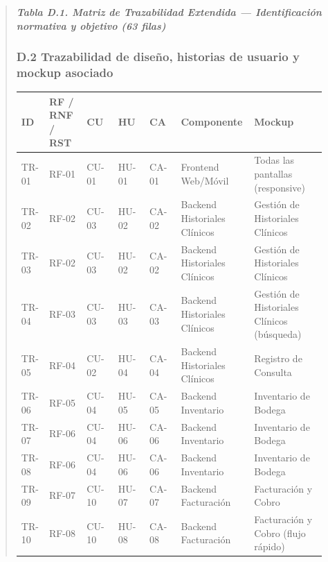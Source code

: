 \documentclass[
]{article}
\newcounter{none} %
\begin{document}
\begin{quote}
\protect{}\label{_bookmarkD1}{}\emph{\textbf{Tabla D.1. Matriz de Trazabilidad Extendida --- Identificación normativa y objetivo (63 filas)}}

\subsubsection{D.2 Trazabilidad de diseño, historias de usuario y mockup asociado}\label{d2-trazabilidad-diseno}

{\footnotesize
\def\LTcaptype{none}
\begin{longtable}[]{|
  >{\raggedright\arraybackslash}p{0.08\linewidth}|
  >{\raggedright\arraybackslash}p{0.12\linewidth}|
  >{\raggedright\arraybackslash}p{0.10\linewidth}|
  >{\raggedright\arraybackslash}p{0.10\linewidth}|
  >{\raggedright\arraybackslash}p{0.10\linewidth}|
  >{\raggedright\arraybackslash}p{0.22\linewidth}|
  >{\raggedright\arraybackslash}p{0.23\linewidth}|}
\hline
\textbf{ID} & \textbf{RF / RNF / RST} & \textbf{CU} & \textbf{HU} & \textbf{CA} & \textbf{Componente} & \textbf{Mockup} \\
\hline
\endhead
\hline
\endlastfoot
TR-01 & RF-01 & CU-01 & HU-01 & CA-01 & Frontend Web/Móvil & Todas las pantallas (responsive) \\
\hline
TR-02 & RF-02 & CU-03 & HU-02 & CA-02 & Backend Historiales Clínicos & Gestión de Historiales Clínicos \\
\hline
TR-03 & RF-02 & CU-03 & HU-02 & CA-02 & Backend Historiales Clínicos & Gestión de Historiales Clínicos \\
\hline
TR-04 & RF-03 & CU-03 & HU-03 & CA-03 & Backend Historiales Clínicos & Gestión de Historiales Clínicos (búsqueda) \\
\hline
TR-05 & RF-04 & CU-02 & HU-04 & CA-04 & Backend Historiales Clínicos & Registro de Consulta \\
\hline
TR-06 & RF-05 & CU-04 & HU-05 & CA-05 & Backend Inventario & Inventario de Bodega \\
\hline
TR-07 & RF-06 & CU-04 & HU-06 & CA-06 & Backend Inventario & Inventario de Bodega \\
\hline
TR-08 & RF-06 & CU-04 & HU-06 & CA-06 & Backend Inventario & Inventario de Bodega \\
\hline
TR-09 & RF-07 & CU-10 & HU-07 & CA-07 & Backend Facturación & Facturación y Cobro \\
\hline
TR-10 & RF-08 & CU-10 & HU-08 & CA-08 & Backend Facturación & Facturación y Cobro (flujo rápido) \\
\hline

\end{longtable}}
\end{quote}
\end{document}

